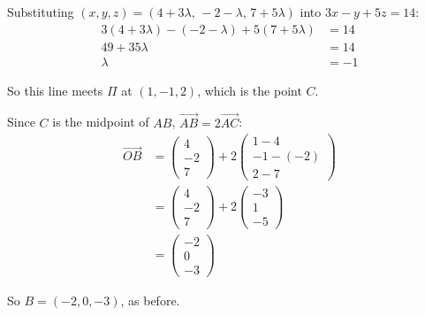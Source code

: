 \documentclass[leqno]{article}
\begin{document}
\begin{enumerate}[
  label=\textbf{\arabic*.},
  leftmargin=*,
  topsep=0pt,
  partopsep=0pt,
  parsep=0pt
]
\begin{djsSolution}
{Substituting \((x,y,z)=(4+3\lambda,\,-2-\lambda,\,7+5\lambda)\) into \(3x-y+5z=14\):
\begin{align*}
3(4+3\lambda)-(-2-\lambda)+5(7+5\lambda)&=14\\
49+35\lambda&=14\\
\lambda&=-1
\end{align*}

So this line meets \(\Pi\) at \((1,-1,2)\), which is the point \(C\).

Since \(C\) is the midpoint of \(AB\), \(\overrightarrow{AB}=2\overrightarrow{AC}\):
\begin{align*}
\overrightarrow{OB}
&=\begin{pmatrix}4\\-2\\7\end{pmatrix}+2\begin{pmatrix}1-4\\-1-(-2)\\2-7\end{pmatrix}\\
&=\begin{pmatrix}4\\-2\\7\end{pmatrix}+2\begin{pmatrix}-3\\1\\-5\end{pmatrix}\\
&=\begin{pmatrix}-2\\0\\-3\end{pmatrix}
\end{align*}

So \(B=(-2,0,-3)\), as before.
\par}
\end{djsSolution}


\newpage

\questionitem


\end{enumerate}
\end{document}
